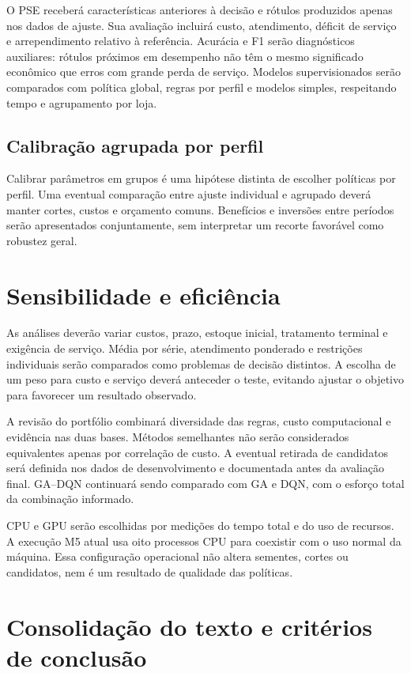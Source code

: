 O PSE receberá características anteriores à decisão e rótulos produzidos apenas nos dados de ajuste. Sua avaliação incluirá custo, atendimento, déficit de serviço e arrependimento relativo à referência. Acurácia e F1 serão diagnósticos auxiliares: rótulos próximos em desempenho não têm o mesmo significado econômico que erros com grande perda de serviço. Modelos supervisionados serão comparados com política global, regras por perfil e modelos simples, respeitando tempo e agrupamento por loja.

\subsection{Calibração agrupada por perfil}
\label{sec:robustez_pooling}

Calibrar parâmetros em grupos é uma hipótese distinta de escolher políticas por perfil. Uma eventual comparação entre ajuste individual e agrupado deverá manter cortes, custos e orçamento comuns. Benefícios e inversões entre períodos serão apresentados conjuntamente, sem interpretar um recorte favorável como robustez geral.

\section{Sensibilidade e eficiência}

As análises deverão variar custos, prazo, estoque inicial, tratamento terminal e exigência de serviço. Média por série, atendimento ponderado e restrições individuais serão comparados como problemas de decisão distintos. A escolha de um peso para custo e serviço deverá anteceder o teste, evitando ajustar o objetivo para favorecer um resultado observado.

A revisão do portfólio combinará diversidade das regras, custo computacional e evidência nas duas bases. Métodos semelhantes não serão considerados equivalentes apenas por correlação de custo. A eventual retirada de candidatos será definida nos dados de desenvolvimento e documentada antes da avaliação final. GA--DQN continuará sendo comparado com GA e DQN, com o esforço total da combinação informado.

CPU e GPU serão escolhidas por medições do tempo total e do uso de recursos. A execução M5 atual usa oito processos CPU para coexistir com o uso normal da máquina. Essa configuração operacional não altera sementes, cortes ou candidatos, nem é um resultado de qualidade das políticas.

\section{Consolidação do texto e critérios de conclusão}

